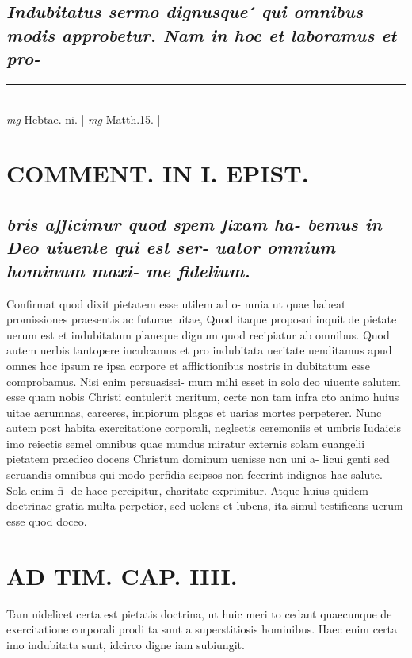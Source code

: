 \documentclass{article}
\begin{document}
\begin{pages}
\subsection*{\textit{Indubitatus sermo dignusque ́ qui omnibus modis approbetur. Nam in hoc et laboramus et pro- }}
\vspace{0.5cm}\noindent
\vspace{0.2cm}\rule{1cm}{0.2pt}\\ 
\hspace{0.2cm}\textit{mg}
\footnotesize Hebtae. ni. 
\normalsize| 
\hspace{0.2cm}\textit{mg}
\footnotesize Matth.15. 
\normalsize| 
\section*{COMMENT. IN I. EPIST. }
{}
\subsection*{\textit{bris afficimur quod spem fixam ha- bemus in Deo uiuente qui est ser- uator omnium hominum maxi- me fidelium. }}\pstart Confirmat quod dixit pietatem esse utilem ad o- mnia ut quae habeat promissiones praesentis ac futurae uitae, Quod itaque proposui inquit de pietate uerum est et indubitatum planeque dignum quod recipiatur ab omnibus. Quod autem uerbis tantopere inculcamus et pro indubitata ueritate uenditamus apud omnes hoc ipsum re ipsa corpore et afflictionibus nostris in dubitatum esse comprobamus. Nisi enim persuasissi- mum mihi esset in solo deo uiuente salutem esse quam nobis Christi contulerit meritum, certe non tam infra cto animo huius uitae aerumnas, carceres, impiorum plagas et uarias mortes perpeterer. Nunc autem post habita exercitatione corporali, neglectis ceremoniis et umbris Iudaicis imo reiectis semel omnibus quae mundus miratur externis solam euangelii pietatem praedico docens Christum dominum uenisse non uni a- licui genti sed seruandis omnibus qui modo perfidia seipsos non fecerint indignos hac salute. Sola enim fi- de haec percipitur, charitate exprimitur. Atque huius quidem doctrinae gratia multa perpetior, sed uolens et lubens, ita simul testificans uerum esse quod doceo.  \pend
\section*{AD TIM. CAP. IIII. }
\marginpar{[ p.144 ]}\pstart Tam uidelicet certa est pietatis doctrina, ut huic meri to cedant quaecunque de exercitatione corporali prodi ta sunt a superstitiosis hominibus. Haec enim certa imo indubitata sunt, idcirco digne iam subiungit.  \pend
{}
{}

\end{pages}
\end{document}
